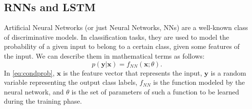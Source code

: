 \subsection{RNNs and LSTM}
Artificial Neural Networks (or just Neural Networks, NNs) are a well-known class of discriminative models. In classification tasks, they are
used to model the probability of a given input to belong to a certain
class, given some features of the input. We can describe them in
mathematical terms as follows:
%
\begin{equation}
  \label{eq:condprob}
  p(\mathbf{y}|\mathbf{x}) = f_{\mathit{NN}}(\mathbf{x}; \theta).
\end{equation}
%
In \eqref{eq:condprob}, $\mathbf{x}$ is the feature vector that represents the input,
$\mathbf{y}$ is a random variable representing the output class
labels, $f_{\mathit{NN}}$ is the function modeled by the neural network, and
$\theta$ is the set of parameters of such a function to be learned during
the training phase.


